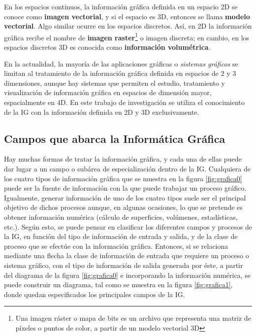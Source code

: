En los espacios continuos, la información gráfica definida en un espacio 2D se conoce como \textbf{imagen vectorial}, y si el espacio es 3D, entonces se llama \textbf{modelo vectorial}. Algo similar ocurre en los espacios discretos. Así, en 2D la información gráfica recibe el nombre de \textbf{imagen raster}\footnote{Una imagen ráster o mapa de bits es un archivo que representa una matriz de píxeles o puntos de color, a partir de un modelo vectorial 3D} o imagen discreta; en cambio, en los espacios discretos 3D es conocida como \textbf{información volumétrica}.

En la actualidad, la mayoría de las aplicaciones gráficas o \textit{sistemas gráficos} se limitan al tratamiento de la información gráfica definida en espacios de 2 y 3 dimensiones, aunque hay sistemas que permiten el estudio, tratamiento y visualización de información gráfica en espacios de dimensión mayor, espacialmente en 4D. En este trabajo de investigación se utiliza el conocimiento de la IG con la información definida en 2D y 3D exclusivamente.

\subsection{Campos que abarca la Informática Gráfica}
Hay muchas formas de tratar la información gráfica, y cada una de ellas puede dar lugar a un campo o subárea de especialización dentro de la IG.
Cualquiera de los cuatro tipos de información gráfica que se muestra en la figura \ref{fig:grafica0} puede ser la fuente de información con la que puede trabajar un proceso gráfico. Igualmente, generar información de uno de los cuatro tipos suele ser el principal objetivo de dichos procesos aunque, en algunas ocasiones, lo que se pretende es obtener información numérica (cálculo de superficies, volúmenes, estadísticas, etc.).
Según esto, se puede pensar en clasificar los diferentes campos y procesos de la IG, en función del tipo de información de entrada y salida, y de la clase de proceso que se efectúe con la información gráfica.
Entonces, si se relaciona mediante una flecha la clase de información de entrada que requiere un proceso o sistema gráfico, con el tipo de información de salida generada por éste, a partir del diagrama de la figura \ref{fig:grafica0} e incorporando la información numérica, se puede construir un diagrama, tal como se muestra en la figura \ref{fig:grafica1}, donde quedan especificados los principales campos de la IG.

